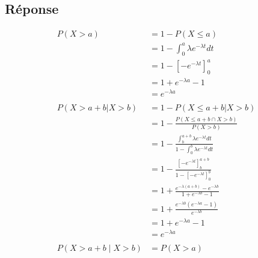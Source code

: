 \documentclass[10pt,a4paper,twoside]{article}
\begin{document}
\subsection*{Réponse}
\begin{align*}
P(X>a) &= 1-P(X\leqslant a)\\
&= 1-\int_{0}^{a}\lambda e^{-\lambda t}dt\\
&= 1-\left[ -e^{-\lambda t} \right]_{0}^{a}\\
&= 1 + e^{-\lambda a} - 1\\
&= e^{-\lambda a}\\
\\
P(X>a+b|X>b) &= 1-P(X\leqslant a+b | X>b)\\
&= 1-\frac{P(X\leqslant a+b \cap X>b)}{P(X>b)}\\
&= 1- \frac{\int_{b}^{a+b} \lambda e^{-\lambda t} dt}{1-\int_{0}^{b}\lambda e^{-\lambda t}dt}\\
&= 1-\frac{\left[ -e^{-\lambda t} \right]_{b}^{a+b}}{1-\left[ -e^{-\lambda t} \right]_{0}^{b}}\\
&= 1 + \frac{e^{-\lambda(a+b)} - e^{-\lambda b}}{1 + e^{-\lambda b} - 1}\\
&= 1 + \frac{e^{-\lambda b} (e^{-\lambda a} - 1)}{e^{-\lambda b}}\\
&= 1 + e^{-\lambda a} - 1\\
&= e^{-\lambda a}\\
\\
P(X>a+b\mid X>b) &= P(X>a)
\end{align*}


%
\end{document}
